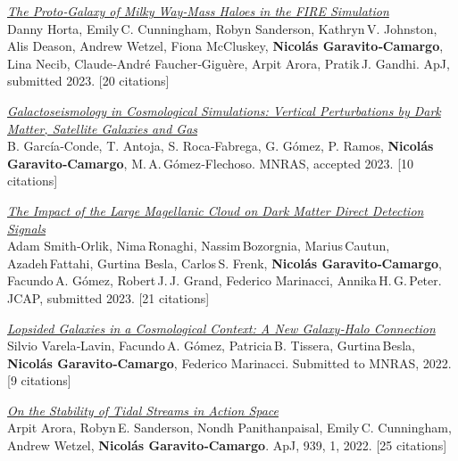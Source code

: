 \documentclass[14pt]{article}
\begin{document}
\begin{etaremune}
\item \textit{\href{https://ui.adsabs.harvard.edu/abs/2023ApJ...subm/ABChorta/abstract}{The Proto‑Galaxy of Milky Way‑Mass Haloes in the FIRE Simulation}}\\
{\small \color{darkgray} Danny Horta, Emily C. Cunningham, Robyn Sanderson, Kathryn V. Johnston, Alis Deason, Andrew Wetzel, Fiona McCluskey, \textbf{Nicol\'as Garavito‑Camargo}, Lina Necib, Claude‑André Faucher‑Giguère, Arpit Arora, Pratik J. Gandhi. ApJ, submitted 2023. [20 citations]}

\item \textit{\href{https://ui.adsabs.harvard.edu/abs/2023MNRAS...accepted/GConde/abstract}{Galactoseismology in Cosmological Simulations: Vertical Perturbations by Dark Matter, Satellite Galaxies and Gas}}\\
{\small \color{darkgray} B. García‑Conde, T. Antoja, S. Roca‑Fabrega, G. Gómez, P. Ramos, \textbf{Nicol\'as Garavito‑Camargo}, M. A. Gómez‑Flechoso. MNRAS, accepted 2023. [10 citations]}

\item \textit{\href{https://ui.adsabs.harvard.edu/abs/2023JCAP...submitted/DMLMC/abstract}{The Impact of the Large Magellanic Cloud on Dark Matter Direct Detection Signals}}\\
{\small \color{darkgray} Adam Smith‑Orlik, Nima Ronaghi, Nassim Bozorgnia, Marius Cautun, Azadeh Fattahi, Gurtina Besla, Carlos S. Frenk, \textbf{Nicol\'as Garavito‑Camargo}, Facundo A. Gómez, Robert J. J. Grand, Federico Marinacci, Annika H. G. Peter. JCAP, submitted 2023. [21 citations]}

\item \textit{\href{https://ui.adsabs.harvard.edu/abs/2022MNRAS...submitted/LopsidedGal/abstract}{Lopsided Galaxies in a Cosmological Context: A New Galaxy‑Halo Connection}}\\
{\small \color{darkgray} Silvio Varela‑Lavin, Facundo A. Gómez, Patricia B. Tissera, Gurtina Besla, \textbf{Nicol\'as Garavito‑Camargo}, Federico Marinacci. Submitted to MNRAS, 2022. [9 citations]}

\item \textit{\href{https://ui.adsabs.harvard.edu/abs/2022ApJ...939...01A/abstract}{On the Stability of Tidal Streams in Action Space}}\\
{\small \color{darkgray} Arpit Arora, Robyn E. Sanderson, Nondh Panithanpaisal, Emily C. Cunningham, Andrew Wetzel, \textbf{Nicol\'as Garavito‑Camargo}. ApJ, 939, 1, 2022. [25 citations]}


\end{etaremune}
\end{document}

